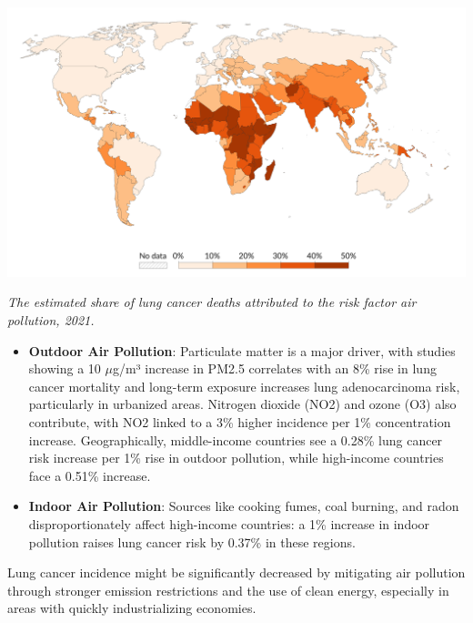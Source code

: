 \includegraphics[width=\textwidth]{../assets/02-etiology/share-of-lung-cancer-deaths-attributed-to-air-pollution.png}
\begin{center} 
    \small\textit{The estimated share of lung cancer deaths attributed to the risk factor air 
    pollution, 2021.\cite{ihme2016}}
\end{center} 

\newpage

\begin{itemize}
    \item \textbf{Outdoor Air Pollution}: Particulate matter is a major driver, with studies showing 
    a 10 $\mu$g/m³ increase in PM2.5 correlates with an 8\% rise in lung cancer mortality\cite{38513187} 
    and long-term exposure increases lung adenocarcinoma risk, particularly in urbanized areas. 
    Nitrogen dioxide (NO2) and ozone (O3) also contribute, with NO2 linked to a 3\% higher incidence 
    per 1\% concentration increase. Geographically, middle-income countries see a 0.28\% lung cancer 
    risk increase per 1\% rise in outdoor pollution, while high-income countries face a 0.51\% 
    increase.\cite{jco2023}

    \item \textbf{Indoor Air Pollution}: Sources like cooking fumes, coal burning, and radon 
    disproportionately affect high-income countries: a 1\% increase in indoor pollution raises lung 
    cancer risk by 0.37\% in these regions.\cite{fpubh.2024.1372320}
\end{itemize}

Lung cancer incidence might be significantly decreased by mitigating air pollution through stronger 
emission restrictions and the use of clean energy, especially in areas with quickly industrializing 
economies.

